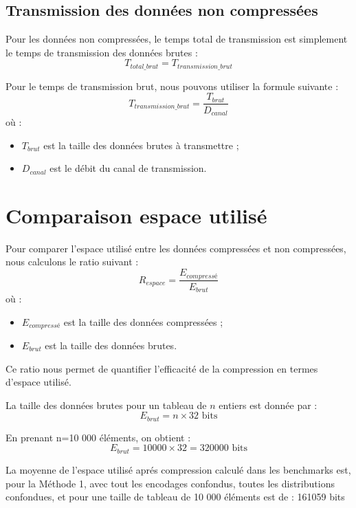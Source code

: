 \documentclass{rapportClass} %
\begin{document}
\subsection{Transmission des données non compressées}
Pour les données non compressées, le temps total de transmission est simplement le temps de transmission des données brutes :
\begin{equation}
    T_{total\_brut} = T_{transmission\_brut}
\end{equation}

Pour le temps de transmission brut, nous pouvons utiliser la formule suivante :
\begin{equation}
    T_{transmission\_brut} = \frac{T_{brut}}{D_{canal}}
\end{equation}
où :
\begin{itemize}
    \item $T_{brut}$ est la taille des données brutes à transmettre ;
    \item $D_{canal}$ est le débit du canal de transmission.
\end{itemize}


\section{Comparaison espace utilisé}
Pour comparer l'espace utilisé entre les données compressées et non compressées, nous calculons le ratio suivant :
\begin{equation}
    R_{espace} = \frac{E_{compressé}}{E_{brut}}
\end{equation}
où :
\begin{itemize}
    \item $E_{compressé}$ est la taille des données compressées ;
    \item $E_{brut}$ est la taille des données brutes.
\end{itemize}
Ce ratio nous permet de quantifier l'efficacité de la compression en termes d'espace utilisé.

La taille des données brutes pour un tableau de $n$ entiers est donnée par :
\begin{equation}
    E_{brut} = n \times 32 \text{ bits}
\end{equation}

En prenant n=10 000 éléments, on obtient :
\begin{equation}
    E_{brut} = 10 000 \times 32 = 320000 \text{ bits}
\end{equation}

La moyenne de l'espace utilisé aprés compression calculé dans les benchmarks est, pour la Méthode 1, avec tout les encodages confondus, 
toutes les distributions confondues, et pour une taille de tableau de 10 000 éléments est de : 161059 bits
\end{document}
